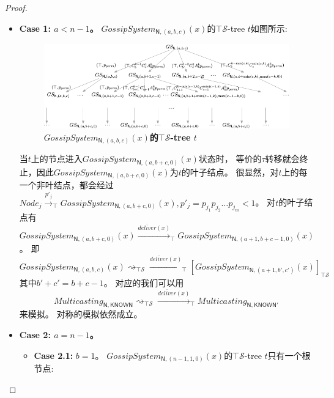 \begin{proof}
\begin{itemize}
{        %
        \begin{itemize}
            \item {\textbf{Case 1: $a<n-1$。}
            $GossipSystem_{\mathsf{N},(a,b,c)}(x)$的$\top \mathcal{S}$-tree $t$如图所示:
            \begin{figure}[!htbp]
            	\small
            	\centering
            	\includegraphics[width=14cm]{../figure/epsilon_tree.png}
                \caption{\textbf{$GossipSystem_{\mathsf{N},(a,b,c)}(x)$的$\top\mathcal{S}$-tree $t$}}
                \label{fig_epsilon_1}
            \end{figure}
            当$t$上的节点进入$GossipSystem_{\mathsf{N},(a,b+c,0)}(x)$状态时，
            等价的$\tau$转移就会终止，因此$GossipSystem_{\mathsf{N},(a,b+c,0)}(x)$为$t$的叶子结点。
            很显然，对$t$上的每一个非叶结点，都会经过$Node_j\stackrel{p'_j}{\rightarrow}_{\top}GossipSystem_{\mathsf{N},(a,b+c,0)}(x),p'_j=p_{j_1}p_{j_2}\dots p_{j_m}<1$。
            对$t$的叶子结点有$GossipSystem_{\mathsf{N},(a,b+c,0)}(x)\stackrel{\overline{deliver}(x)}{\longrightarrow}_{\top} GossipSystem_{\mathsf{N},(a+1,b+c-1,0)}(x)$。
            即
            $$GossipSystem_{\mathsf{N},(a,b,c)}(x)\rightsquigarrow_{\top\mathcal{S}}\stackrel{\overline{deliver}(x)}{\longrightarrow}_{\top}[GossipSystem_{\mathsf{N},(a+1,b',c')}(x)]_{\top\mathcal{S}}$$
            其中$b'+c'=b+c-1$。
            对应的我们可以用$$Multicasting_{\mathsf{N},\mathsf{KNOWN}}\rightsquigarrow_{\top\mathcal{S}}\stackrel{\overline{deliver}(x)}{\longrightarrow}_{\top} Multicasting_{\mathsf{N}, \mathsf{KNOWN}'}$$来模拟。
            对称的模拟依然成立。
            }
            \item {\textbf{Case 2: $a=n-1$。}
            \begin{itemize}
               \item {
                  {\textbf{Case 2.1:} $b=1$。}
                  $GossipSystem_{\mathsf{N},(n-1,1,0)}(x)$的$\top \mathcal{S}$-tree $t$只有一个根节点:

}
\end{itemize}}
\end{itemize}}
\end{itemize}
\end{proof}
